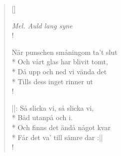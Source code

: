 
\settowidth{\versewidth}{När punschen småningom ta't slut}



\begin{verse}[\versewidth]

\flagverse{}
\emph{Mel. Auld lang syne}\\!


När punschen småningom ta't slut\\*
Och vårt glas har blivit tomt,\\*
Då upp och ned vi vända det\\*
Tills dess inget rinner ut\\!


||: Så slicka vi, så slicka vi,\\*
Båd utanpå och i.\\*
Och finns det ändå något kvar\\*
Får det va' till sämre dar :||\\!


\end{verse}

